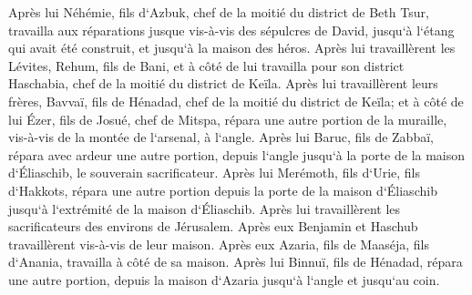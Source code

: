 \verse Après lui Néhémie, fils d`Azbuk, chef de la moitié du district de Beth Tsur, travailla aux réparations jusque vis-à-vis des sépulcres de David, jusqu`à l`étang qui avait été construit, et jusqu`à la maison des héros. 
\verse Après lui travaillèrent les Lévites, Rehum, fils de Bani, et à côté de lui travailla pour son district Haschabia, chef de la moitié du district de Keïla. 
\verse Après lui travaillèrent leurs frères, Bavvaï, fils de Hénadad, chef de la moitié du district de Keïla; 
\verse et à côté de lui Ézer, fils de Josué, chef de Mitspa, répara une autre portion de la muraille, vis-à-vis de la montée de l`arsenal, à l`angle. 
\verse Après lui Baruc, fils de Zabbaï, répara avec ardeur une autre portion, depuis l`angle jusqu`à la porte de la maison d`Éliaschib, le souverain sacrificateur. 
\verse Après lui Merémoth, fils d`Urie, fils d`Hakkots, répara une autre portion depuis la porte de la maison d`Éliaschib jusqu`à l`extrémité de la maison d`Éliaschib. 
\verse Après lui travaillèrent les sacrificateurs des environs de Jérusalem. 
\verse Après eux Benjamin et Haschub travaillèrent vis-à-vis de leur maison. Après eux Azaria, fils de Maaséja, fils d`Anania, travailla à côté de sa maison. 
\verse Après lui Binnuï, fils de Hénadad, répara une autre portion, depuis la maison d`Azaria jusqu`à l`angle et jusqu`au coin. 
